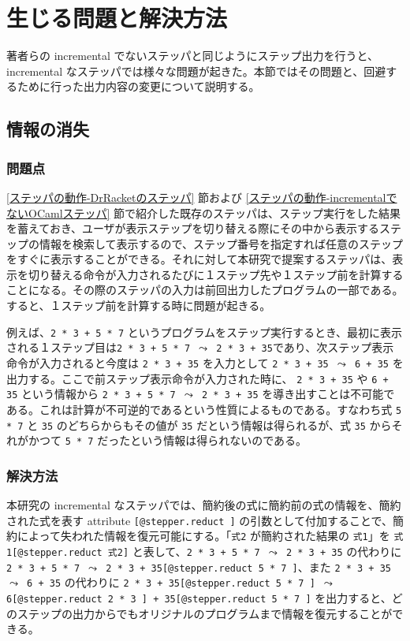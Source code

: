 \section{生じる問題と解決方法}
\label{生じる問題と解決方法}

著者らの incremental でないステッパ\cite{FSA18}と同じようにステップ出力を行うと、incremental なステッパでは様々な問題が起きた。本節ではその問題と、回避するために行った出力内容の変更について説明する。

\subsection{情報の消失}
\label{生じる問題と解決方法-情報の消失}
\subsubsection{問題点}
\label{生じる問題と解決方法-情報の消失-問題点}
\ref{ステッパの動作-DrRacketのステッパ} 節および \ref{ステッパの動作-incrementalでないOCamlステッパ} 節で紹介した既存のステッパは、ステップ実行をした結果を蓄えておき、ユーザが表示ステップを切り替える際にその中から表示するステップの情報を検索して表示するので、ステップ番号を指定すれば任意のステップをすぐに表示することができる。それに対して本研究で提案するステッパは、表示を切り替える命令が入力されるたびに１ステップ先や１ステップ前を計算することになる。その際のステッパの入力は前回出力したプログラムの一部である。すると、１ステップ前を計算する時に問題が起きる。

例えば、\texttt{2 * 3 + 5 * 7} というプログラムをステップ実行するとき、最初に表示される１ステップ目は\texttt{2 * 3 + 5 * 7 $\leadsto$ 2 * 3 + 35}であり、次ステップ表示命令が入力されると今度は \texttt{2 * 3 + 35} を入力として \texttt{2 * 3 + 35 $\leadsto$ 6 + 35} を出力する。ここで前ステップ表示命令が入力された時に、 \texttt{2 * 3 + 35} や \texttt{6 + 35} という情報から \texttt{2 * 3 + 5 * 7 $\leadsto$ 2 * 3 + 35} を導き出すことは不可能である。これは計算が不可逆的であるという性質によるものである。すなわち式 \texttt{5 * 7} と \texttt{35} のどちらからもその値が \texttt{35} だという情報は得られるが、式 \texttt{35} からそれがかつて \texttt{5 * 7} だったという情報は得られないのである。

\subsubsection{解決方法}
\label{生じる問題と解決方法-情報の消失-解決方法}

本研究の incremental なステッパでは、簡約後の式に簡約前の式の情報を、簡約された式を表す attribute \texttt{[@stepper.reduct ]} の引数として付加することで、簡約によって失われた情報を復元可能にする。「\texttt{式2} が簡約された結果の \texttt{式1}」を \texttt{式1[@stepper.reduct 式2]} と表して、\texttt{2 * 3 + 5 * 7 $\leadsto$ 2 * 3 + 35} の代わりに \texttt{2 * 3 + 5 * 7 $\leadsto$ 2 * 3 + 35[@stepper.reduct 5 * 7 ]}、また \texttt{2 * 3 + 35 $\leadsto$ 6 + 35} の代わりに \texttt{2 * 3 + 35[@stepper.reduct 5 * 7 ] $\leadsto$ 6[@stepper.reduct 2 * 3 ] + 35[@stepper.reduct 5 * 7 ]} を出力すると、どのステップの出力からでもオリジナルのプログラムまで情報を復元することができる。

